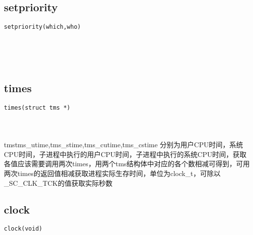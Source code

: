 \documentclass[10pt,a4paper]{article}
\begin{document}
\subsection{setpriority}
\begin{spacing}{2.0}
\lstset{language=C,numbers=none}
\begin{lstlisting}
setpriority(which,who)
\end{lstlisting}
{\large\color[rgb]{0.2,0.4,0.6}{which:}} \\
{\large\color[rgb]{0.2,0.4,0.6}{who:}}
\paragraph{ \ \ }
\end{spacing}

\subsection{times}
\begin{spacing}{2.0}
\lstset{language=C,numbers=none}
\begin{lstlisting}
times(struct tms *)
\end{lstlisting}
{\large\color[rgb]{0.2,0.4,0.6}{*:}}
\paragraph{ \ \ }tms{tms\_utime,tms\_stime,tms\_cutime,tms\_cstime} 分别为用户CPU时间，系统CPU时间，子进程中执行的用户CPU时间，子进程中执行的系统CPU时间，获取各值应该需要调用两次times，用两个tms结构体中对应的各个数相减可得到，可用两次times的返回值相减获取进程实际生存时间，单位为clock\_t，可除以\_SC\_CLK\_TCK的值获取实际秒数
\end{spacing}

\subsection{clock}
\begin{spacing}{2.0}
\lstset{language=C,numbers=none}
\begin{lstlisting}
clock(void)
\end{lstlisting}
{\large\color[rgb]{0.2,0.4,0.6}{void:}}
\paragraph{ \ \ }
\end{spacing}

\section{\color[rgb]{0.2,0.4,0.6}{系统信息}}
\end{document}
